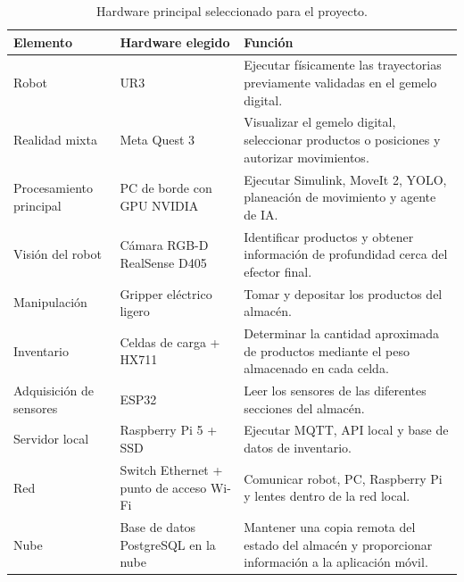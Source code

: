 \documentclass[12pt,letterpaper]{article}
\begin{document}
\begin{table}[H]
\centering
\small
\renewcommand{\arraystretch}{1.35}

\begin{tabularx}{\textwidth}{
    >{\raggedright\arraybackslash}p{3.3cm}
    >{\raggedright\arraybackslash}p{3.6cm}
    X
}

\toprule
\textbf{Elemento} & \textbf{Hardware elegido} & \textbf{Función} \\
\midrule

Robot &
UR3 &
Ejecutar físicamente las trayectorias previamente validadas en el gemelo digital. \\

Realidad mixta &
Meta Quest 3 &
Visualizar el gemelo digital, seleccionar productos o posiciones y autorizar movimientos. \\

Procesamiento principal &
PC de borde con GPU NVIDIA &
Ejecutar Simulink, MoveIt 2, YOLO, planeación de movimiento y agente de IA. \\

Visión del robot &
Cámara RGB-D RealSense D405 &
Identificar productos y obtener información de profundidad cerca del efector final. \\

Manipulación &
Gripper eléctrico ligero &
Tomar y depositar los productos del almacén. \\

Inventario &
Celdas de carga + HX711 &
Determinar la cantidad aproximada de productos mediante el peso almacenado en cada celda. \\

Adquisición de sensores &
ESP32 &
Leer los sensores de las diferentes secciones del almacén. \\

Servidor local &
Raspberry Pi 5 + SSD &
Ejecutar MQTT, API local y base de datos de inventario. \\

Red &
Switch Ethernet + punto de acceso Wi-Fi &
Comunicar robot, PC, Raspberry Pi y lentes dentro de la red local. \\

Nube &
Base de datos PostgreSQL en la nube &
Mantener una copia remota del estado del almacén y proporcionar información a la aplicación móvil. \\

\bottomrule
\end{tabularx}

\caption{Hardware principal seleccionado para el proyecto.}

\end{table}
\end{document}
